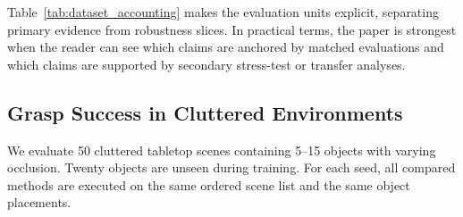 \documentclass[12pt]{article}
\begin{document}
\begin{table}[!htbp]
\centering
\caption{Dataset and evaluation accounting. Counts refer to the locked protocol used for the reported manuscript results.}
\label{tab:dataset_accounting}
\small\setlength{\tabcolsep}{4pt}
\end{table}

Table~\ref{tab:dataset_accounting} makes the evaluation units explicit, separating primary evidence from robustness slices. In practical terms, the paper is strongest when the reader can see which claims are anchored by matched evaluations and which claims are supported by secondary stress-test or transfer analyses.

\subsection{Grasp Success in Cluttered Environments}

We evaluate 50 cluttered tabletop scenes containing 5--15 objects with varying occlusion. Twenty objects are unseen during training. For each seed, all compared methods are executed on the same ordered scene list and the same object placements.
\end{document}
